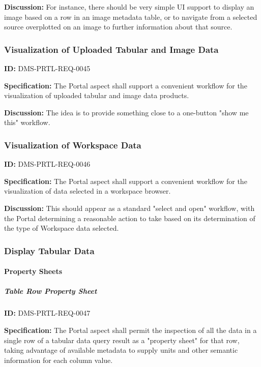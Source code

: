 \documentclass[SE,toc,lsstdraft]{lsstdoc}
\begin{document}
\textbf{Discussion:}
For instance, there should be very simple UI support to display an image based on a row in an image metadata table, or to navigate from a selected source overplotted on an image to further information about that source.

\subsubsection{Visualization of Uploaded Tabular and Image Data}

\label{DMS-PRTL-REQ-0045}
\textbf{ID:} DMS-PRTL-REQ-0045

\textbf{Specification:}
The Portal aspect shall support a convenient workflow for the visualization of uploaded tabular and image data products.

\textbf{Discussion:}
The idea is to provide something close to a one-button "show me this" workflow.

\subsubsection{Visualization of Workspace Data}

\label{DMS-PRTL-REQ-0046}
\textbf{ID:} DMS-PRTL-REQ-0046

\textbf{Specification:}
The Portal aspect shall support a convenient workflow for the visualization of data selected in a workspace browser.

\textbf{Discussion:}
This should appear as a standard "select and open" workflow, with the Portal determining a reasonable action to take based on its determination of the type of Workspace data selected.

\subsubsection{Display Tabular Data}

\paragraph{Property Sheets}\hfill  %

\subparagraph{Table Row Property Sheet}\hfill  %

\label{DMS-PRTL-REQ-0047}
\textbf{ID:} DMS-PRTL-REQ-0047

\textbf{Specification:}
The Portal aspect shall permit the inspection of all the data in a single row of a tabular data query result as a "property sheet" for that row, taking advantage of available metadata to supply units and other semantic information for each column value.
\end{document}
